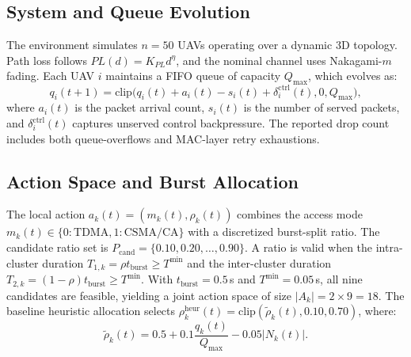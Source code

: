 \subsection{System and Queue Evolution}
The environment simulates $n=50$ UAVs operating over a dynamic 3D topology. Path loss follows $PL(d) = K_{PL}d^\eta$, and the nominal channel uses Nakagami-$m$ fading. Each UAV $i$ maintains a FIFO queue of capacity $Q_{\max}$, which evolves as:
\begin{equation}
q_i(t+1) = \text{clip}\big(q_i(t) + a_i(t) - s_i(t) + \delta^{\text{ctrl}}_i(t), 0, Q_{\max}\big),
\end{equation}
where $a_i(t)$ is the packet arrival count, $s_i(t)$ is the number of served packets, and $\delta^{\text{ctrl}}_i(t)$ captures unserved control backpressure. The reported drop count includes both queue-overflows and MAC-layer retry exhaustions.

\subsection{Action Space and Burst Allocation}
The local action $a_k(t) = (m_k(t), \rho_k(t))$ combines the access mode $m_k(t) \in \{0:\text{TDMA}, 1:\text{CSMA/CA}\}$ with a discretized burst-split ratio. The candidate ratio set is $P_{\text{cand}} = \{0.10, 0.20, \dots, 0.90\}$.
A ratio is valid when the intra-cluster duration $T_{1,k} = \rho t_{\text{burst}} \geq T^{\min}$ and the inter-cluster duration $T_{2,k} = (1 - \rho)t_{\text{burst}} \geq T^{\min}$. With $t_{\text{burst}} = 0.5$\,s and $T^{\min} = 0.05$\,s, all nine candidates are feasible, yielding a joint action space of size $|A_k| = 2 \times 9 = 18$. The baseline heuristic allocation selects $\rho^{\text{heur}}_k(t) = \text{clip}(\tilde{\rho}_k(t), 0.10, 0.70)$, where:
\begin{equation}
\tilde{\rho}_k(t) = 0.5 + 0.1 \frac{q_k(t)}{Q_{\max}} - 0.05|N_k(t)|.
\end{equation}

